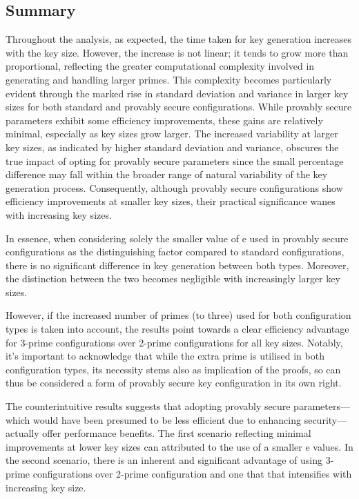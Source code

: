 \documentclass[]{final_report}
\theoremstyle{definition}
\begin{document}
\subsection*{Summary}
Throughout the analysis, as expected, the time taken for key generation increases with the key size. However, the increase is not linear; it tends to grow more than proportional, reflecting the greater computational complexity involved in generating and handling larger primes. This complexity becomes particularly evident through the marked rise in standard deviation and variance in larger key sizes for both standard and provably secure configurations.
While provably secure parameters exhibit some efficiency improvements, these gains are relatively minimal, especially as key sizes grow larger. The increased variability at larger key sizes, as indicated by higher standard deviation and variance, obscures the true impact of opting for provably secure parameters since the small percentage difference may fall within the broader range of natural variability of the key generation process. Consequently, although provably secure configurations show efficiency improvements at smaller key sizes, their practical significance wanes with increasing key sizes.

In essence, when considering solely the smaller value of e used in provably secure configurations as the distinguishing factor compared to standard configurations, there is no significant difference in key generation between both types. Moreover, the distinction between the two becomes negligible with increasingly larger key sizes. 

However, if the increased number of primes (to three) used for both configuration types is taken into account, the results point towards a clear efficiency advantage for 3-prime configurations over 2-prime configurations for all key sizes. Notably, it's important to acknowledge that while the extra prime is utilised in both configuration types, its necessity stems also as implication of the proofs, so can thus be considered a form of provably secure key configuration in its own right. 

The counterintuitive results suggests that adopting provably secure parameters—which would have been presumed to be less efficient due to enhancing security— actually offer performance benefits. The first scenario reflecting minimal improvements at lower key sizes can attributed to the use of  a smaller e values. In the second scenario, there is an inherent and significant advantage of using 3-prime configurations over 2-prime configuration and one that that intensifies with increasing key size.
\end{document}
